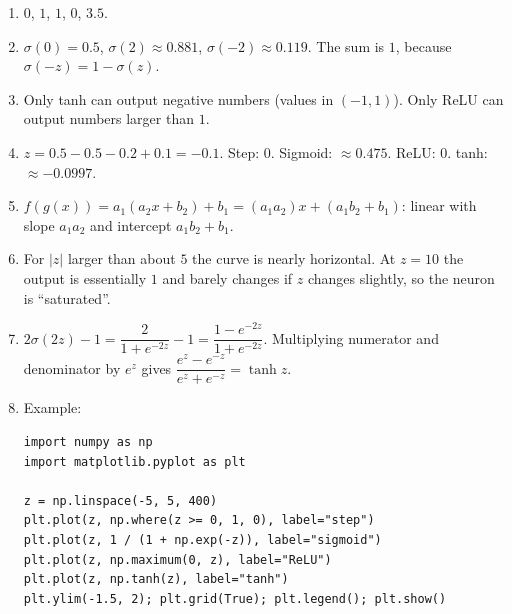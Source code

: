 \begin{enumerate}[label=\textbf{\ansnum.\arabic*}]
  \item $0$, $1$, $1$, $0$, $3.5$.
  \item $\sigma(0)=0.5$, $\sigma(2)\approx0.881$, $\sigma(-2)\approx0.119$. The sum is $1$, because $\sigma(-z)=1-\sigma(z)$.
  \item Only tanh can output negative numbers (values in $(-1,1)$). Only ReLU can output numbers larger than $1$.
  \item $z=0.5-0.5-0.2+0.1=-0.1$. Step: $0$. Sigmoid: $\approx0.475$. ReLU: $0$. tanh: $\approx-0.0997$.
  \item $f(g(x))=a_1(a_2x+b_2)+b_1=(a_1a_2)x+(a_1b_2+b_1)$: linear with slope $a_1a_2$ and intercept $a_1b_2+b_1$.
  \item For $|z|$ larger than about $5$ the curve is nearly horizontal. At $z=10$ the output is essentially $1$ and barely changes if $z$ changes slightly, so the neuron is ``saturated''.
  \item $2\sigma(2z)-1=\dfrac{2}{1+e^{-2z}}-1=\dfrac{1-e^{-2z}}{1+e^{-2z}}$. Multiplying numerator and denominator by $e^{z}$ gives $\dfrac{e^{z}-e^{-z}}{e^{z}+e^{-z}}=\tanh z$.
  \item Example:
\begin{verbatim}
import numpy as np
import matplotlib.pyplot as plt

z = np.linspace(-5, 5, 400)
plt.plot(z, np.where(z >= 0, 1, 0), label="step")
plt.plot(z, 1 / (1 + np.exp(-z)), label="sigmoid")
plt.plot(z, np.maximum(0, z), label="ReLU")
plt.plot(z, np.tanh(z), label="tanh")
plt.ylim(-1.5, 2); plt.grid(True); plt.legend(); plt.show()
\end{verbatim}
\end{enumerate}
